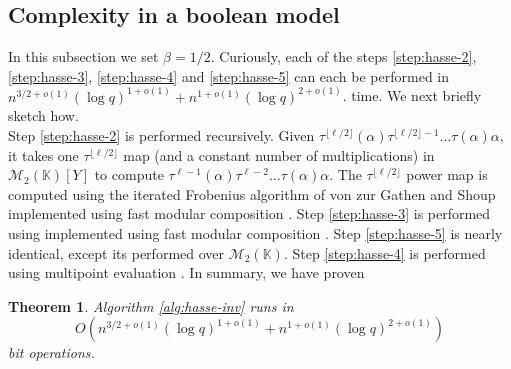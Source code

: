 \documentclass{article}
\theoremstyle{plain}
\newtheorem{theorem}{Theorem}
\theoremstyle{definition}
\def\K{\ensuremath{\mathbb{K}}}
\begin{document}
\subsection{Complexity in a boolean model}

In this subsection we set $\beta = 1/2$. Curiously, each of the steps \ref{step:hasse-2}, 
\ref{step:hasse-3}, \ref{step:hasse-4} and \ref{step:hasse-5} can each be performed in 
$n^{3/2+o(1)} (\log q)^{1+o(1)} + n^{1+o(1)} (\log q)^{2+o(1)}$. time. We next briefly sketch 
how.\\ 
 
 Step \ref{step:hasse-2} is performed recursively. Given 
 $\tau^{\lfloor\ell/2\rfloor}(\alpha)\tau^{\lfloor\ell/2\rfloor-1}\ldots\tau(\alpha) \alpha$, it 
 takes one $\tau^{\lfloor\ell/2\rfloor}$ map (and a constant number of multiplications) in 
 $\mathscr{M}_2(\K)[Y]$ to compute $\tau^{\ell-1}(\alpha)\tau^{\ell-2}\ldots\tau(\alpha)\alpha$. 
 The $\tau^{\lfloor\ell/2\rfloor}$ power map is computed using the iterated Frobenius algorithm of 
 von zur Gathen and Shoup \cite{gs} implemented using fast modular composition \cite{ku}. Step 
 \ref{step:hasse-3} is performed using \cite[Lemma 3]{ks} implemented using fast modular 
 composition \cite{ku}. Step \ref{step:hasse-5} is nearly identical, except its performed over 
 $\mathscr{M}_2(\K)$. Step \ref{step:hasse-4} is performed using multipoint evaluation \cite{vzGG}. 
 In summary, we have proven 
 \begin{theorem}
 	\label{theo:hasse-inv}
 	Algorithm \ref{alg:hasse-inv} runs in 
 	\[O(n^{3/2+o(1)} (\log q)^{1+o(1)} + n^{1+o(1)} (\log q)^{2+o(1)})\]
 	bit operations.
 \end{theorem}





\end{document}
